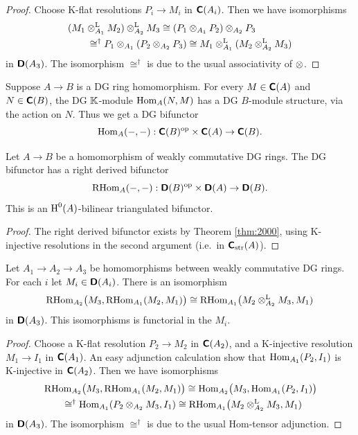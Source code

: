 \begin{proof}
Choose K-flat resolutions $P_i \to M_i$ in $\boldsymbol{\mathsf{C}}(A_i)$. Then we have 
isomorphisms
\[ \begin{aligned}
& (M_1 \otimes^{\mathrm{L}}_{A_1} M_2) \otimes^{\mathrm{L}}_{A_2} M_3 
\cong (P_1 \otimes_{A_1} P_2) \otimes_{A_2} P_3
\\
& \qquad 
\cong^{\dag} P_1 \otimes_{A_1} (P_2 \otimes_{A_2} P_3)
\cong 
M_1 \otimes^{\mathrm{L}}_{A_1} (M_2 \otimes^{\mathrm{L}}_{A_2} M_3)  
\end{aligned} \]
in $\boldsymbol{\mathsf{D}}(A_3)$. The isomorphism $\cong^{\dag}$ is due to the usual 
associativity of $\otimes$.
\end{proof}

Suppose $A \to B$ is a DG ring homomorphism. For every 
$M \in \boldsymbol{\mathsf{C}}(A)$ and $N \in \boldsymbol{\mathsf{C}}(B)$, the DG $\mathbb{K}$-module
$\operatorname{Hom}_{A}(N, M)$ has a DG $B$-module structure, via the action on $N$. 
Thus we get a DG bifunctor 
\begin{equation} \label{eqn:4956}
\operatorname{Hom}_{A}(-, -) : \boldsymbol{\mathsf{C}}(B)^{\mathrm{op}} 
\times \boldsymbol{\mathsf{C}}(A) \to \boldsymbol{\mathsf{C}}(B) .
\end{equation}

\begin{prop} \label{prop:3105}
Let $A \to B$ be a homomorphism of weakly commutative DG rings. 
The DG bifunctor \tup{(\ref{eqn:4956})}
has a right derived bifunctor
\[ \operatorname{RHom}_{A}(-, -) : \boldsymbol{\mathsf{D}}(B)^{\mathrm{op}} 
\times \boldsymbol{\mathsf{D}}(A) \to \boldsymbol{\mathsf{D}}(B) . \]
This is an $\operatorname{H}^0(A)$-bilinear triangulated bifunctor.
\end{prop}

\begin{proof}
The right derived bifunctor exists by Theorem \ref{thm:2000}, using K-injective
resolutions in the second argument (i.e.\ in $\boldsymbol{\mathsf{C}}_{\mathrm{str}}(A)$). 
\end{proof}

\begin{prop} \label{prop:3106}
Let $A_1 \to A_2 \to A_3$ be homomorphisms between weakly commutative DG rings.
For each $i$ let $M_i \in \boldsymbol{\mathsf{D}}(A_i)$.
There is an isomorphism 
\[ \operatorname{RHom}_{A_2} \bigl( M_3, \operatorname{RHom}_{A_1}(M_2, M_1) \bigr) \cong
\operatorname{RHom}_{A_1} \bigl( M_2 \otimes^{\mathrm{L}}_{A_2} M_3, M_1) \]
in $\boldsymbol{\mathsf{D}}(A_3)$.
This isomorphisms is functorial in the $M_i$. 
\end{prop}

\begin{proof}
Choose a K-flat resolution $P_2 \to M_2$ in $\boldsymbol{\mathsf{C}}(A_2)$,
and a K-injective resolution $M_1 \to I_1$ in $\boldsymbol{\mathsf{C}}(A_1)$. 
An easy adjunction calculation show that 
$\operatorname{Hom}_{A_1}(P_2, I_1)$ is K-injective in $\boldsymbol{\mathsf{C}}(A_2)$. 
Then we have isomorphisms
\[ \begin{aligned}
& \operatorname{RHom}_{A_2} \bigl( M_3, \operatorname{RHom}_{A_1}(M_2, M_1) \bigr)
\cong
\operatorname{Hom}_{A_2} \bigl( M_3, \operatorname{Hom}_{A_1}(P_2, I_1) \bigr)
\\
& \qquad 
\cong^{\dag} 
\operatorname{Hom}_{A_1} (P_2 \otimes_{A_2} M_3, I_1) \cong 
\operatorname{RHom}_{A_1} \bigl( M_2 \otimes^{\mathrm{L}}_{A_2} M_3, M_1)
\end{aligned} \]
in $\boldsymbol{\mathsf{D}}(A_3)$. The isomorphism $\cong^{\dag}$ is due to the usual 
Hom-tensor adjunction. 
\end{proof}


